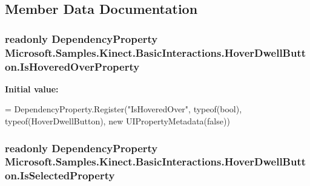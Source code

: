 \subsection{Member Data Documentation}
\hypertarget{class_microsoft_1_1_samples_1_1_kinect_1_1_basic_interactions_1_1_hover_dwell_button_a2f3936f7fb88ba18fe1b55a06f4f662e}{
\subsubsection[{Is\-Hovered\-Over\-Property}]{\setlength{\rightskip}{0pt plus 5cm}readonly Dependency\-Property Microsoft.\-Samples.\-Kinect.\-Basic\-Interactions.\-Hover\-Dwell\-Button.\-Is\-Hovered\-Over\-Property\hspace{0.3cm}{\ttfamily [static]}}}\label{class_microsoft_1_1_samples_1_1_kinect_1_1_basic_interactions_1_1_hover_dwell_button_a2f3936f7fb88ba18fe1b55a06f4f662e}
{\bfseries Initial value\-:}
\begin{DoxyCode}
=
            DependencyProperty.Register(\textcolor{stringliteral}{"IsHoveredOver"}, typeof(\textcolor{keywordtype}{bool}), typeof(HoverDwellButton), \textcolor{keyword}{new} 
      UIPropertyMetadata(\textcolor{keyword}{false}))
\end{DoxyCode}
\hypertarget{class_microsoft_1_1_samples_1_1_kinect_1_1_basic_interactions_1_1_hover_dwell_button_a12c68f6755442576a182987316d0e3f7}{
\subsubsection[{Is\-Selected\-Property}]{\setlength{\rightskip}{0pt plus 5cm}readonly Dependency\-Property Microsoft.\-Samples.\-Kinect.\-Basic\-Interactions.\-Hover\-Dwell\-Button.\-Is\-Selected\-Property\hspace{0.3cm}{\ttfamily [static]}}}\label{class_microsoft_1_1_samples_1_1_kinect_1_1_basic_interactions_1_1_hover_dwell_button_a12c68f6755442576a182987316d0e3f7}
